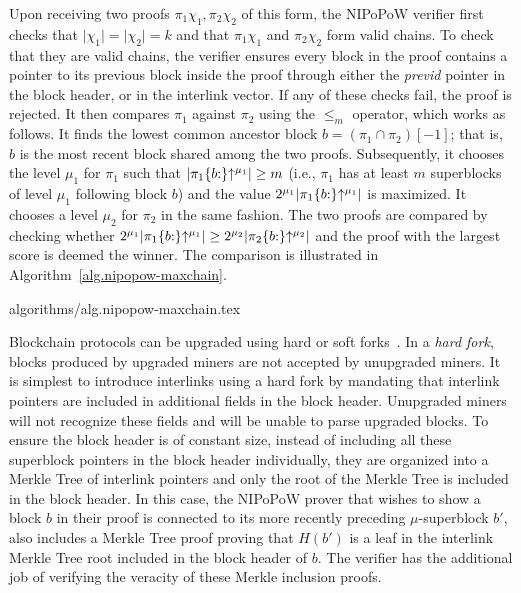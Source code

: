 Upon receiving two proofs $\pi_1\chi_1, \pi_2\chi_2$ of this form, the NIPoPoW verifier
first checks that $\lvert \chi_1 \rvert = \lvert \chi_2 \rvert = k$ and that
$\pi_1 \chi_1$ and $\pi_2 \chi_2$ form valid chains. To check that they are
valid chains, the verifier ensures every block in the
proof contains a pointer to its previous block inside the proof through either
the \emph{previd} pointer in the block header, or in the interlink vector. If
any of these checks fail, the proof is rejected. It then
compares $\pi_1$ against $\pi_2$ using
the $\leq_m$ operator, which works as follows. It finds the
lowest common ancestor block $b = (\pi_1 \cap \pi_2)[-1]$; that is, $b$ is the
most recent block shared among the two proofs. Subsequently, it
chooses the level $\mu_1$ for $\pi_1$ such that
$\lvert \pi_1\{b{:}\}\negthickspace\uparrow^{\mu_1} \rvert \geq m$
(i.e., $\pi_1$ has at least $m$ superblocks of level $\mu_1$ following block
$b$) and the value
$2^{\mu_1} \lvert \pi_1\{b{:}\}\negthickspace\uparrow^{\mu_1} \rvert$
is maximized.
It chooses a level $\mu_2$ for $\pi_2$ in the same fashion. The two proofs are
compared
by checking whether
$2^{\mu_1} \lvert \pi_1\{b{:}\}\negthickspace\uparrow^{\mu_1} \rvert \geq
 2^{\mu_2} \lvert \pi_2\{b{:}\}\negthickspace\uparrow^{\mu_2} \rvert$
and the proof with the largest score is deemed the winner. The comparison is
illustrated in Algorithm~\ref{alg.nipopow-maxchain}.

{algorithms/alg.nipopow-maxchain.tex}

Blockchain protocols can be upgraded using hard or soft
forks~\cite{buterinforks}. In a \emph{hard fork}, blocks produced by
upgraded miners are not accepted by unupgraded miners. It is simplest to
introduce interlinks using a hard fork by mandating that interlink pointers are
included in additional fields in the block header. Unupgraded miners will not
recognize these fields and will be unable to parse upgraded blocks.
To ensure the block header is of constant size, instead of including all these
superblock pointers in the block header individually, they are organized into a
Merkle Tree of interlink pointers and only the root of the Merkle Tree is
included in the block header. In this case, the NIPoPoW prover that wishes to
show a block $b$ in their proof is connected to its more recently preceding
$\mu$-superblock $b'$, also includes a Merkle Tree proof proving that $H(b')$ is
a leaf in the interlink Merkle Tree root included in the block header of $b$.
The verifier has the additional job of verifying the veracity of these Merkle
inclusion proofs.


